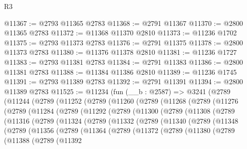 \begin{lexlean}{R3}
\begin{coremodule}
@11367 := @2793 @11365 @2783
@11368 := @2791 @11367
@11370 := @2800 @11365 @2783
@11372 := @11368 @11370 @2810
@11373 := @11236 @1702
@11375 := @2793 @11373 @2783
@11376 := @2791 @11375
@11378 := @2800 @11373 @2783
@11380 := @11376 @11378 @2810
@11381 := @11236 @1727
@11383 := @2793 @11381 @2783
@11384 := @2791 @11383
@11386 := @2800 @11381 @2783
@11388 := @11384 @11386 @2810
@11389 := @11236 @1745
@11391 := @2793 @11389 @2783
@11392 := @2791 @11391
@11394 := @2800 @11389 @2783
@11525 := @11234
    (fun (__b : @2587) =>
    @3241
      (@2789
        (@11244
          (@2789
            (@11252
              (@2789
                (@11260
                  (@2789
                    (@11268
                      (@2789
                        (@11276
                          (@2789
                            (@11284
                              (@2789
                                (@11292
                                  (@2789
                                    (@11300
                                      (@2789
                                        (@11308
                                          (@2789
                                            (@11316
                                              (@2789
                                                (@11324
                                                  (@2789
                                                    (@11332
                                                      (@2789
                                                        (@11340
                                                          (@2789
                                                            (@11348
                                                              (@2789
                                                                (@11356
                                                                  (@2789
                                                                    (@11364
                                                                      (@2789
                                                                        (@11372
                                                                          (@2789
                                                                            (@11380
                                                                              (@2789
                                                                                (@11388
                                                                                  (@2789
                                                                                    (@11392

\end{coremodule}
\end{lexlean}
